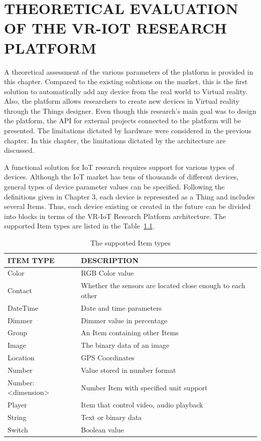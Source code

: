 
\chapter{THEORETICAL EVALUATION OF THE VR-IOT RESEARCH PLATFORM}

A theoretical assessment of the various parameters of the platform is provided in this chapter. Compared to the existing solutions on the market, this is the first solution to automatically add any device from the real world to Virtual reality. Also, the platform allows researchers to create new devices in Virtual reality through the Things designer. Even though this research's main goal was to design the platform, the API for external projects connected to the platform will be presented. The limitations dictated by hardware were considered in the previous chapter. In this chapter, the limitations dictated by the architecture are discussed.

A functional solution for IoT research requires support for various types of devices. Although the IoT market has tens of thousands of different devices, general types of device parameter values ​​can be specified. Following the definitions given in Chapter 3, each device is represented as a Thing and includes several Items. Thus, each device existing or created in the future can be divided into blocks in terms of the VR-IoT Research Platform architecture. The supported Item types are listed in the Table~\ref{tab:items-table}.

\begin{table}
  \centering
  \begin{threeparttable}[c]
    \caption{The supported Item types}
    \label{tab:items-table}
    \begin{tabular}{ll}
      \toprule
      ITEM TYPE    &         DESCRIPTION                 \\
      \midrule
      Color &	RGB Color value \\
      Contact & Whether the sensors are located close enough to each other \\
      DateTime & Date and time parameters \\
      Dimmer &	Dimmer value in percentage \\
      Group &	An Item containing other Items \\
      Image &	The binary data of an image \\
      Location & GPS Coordinates \\
      Number & Value stored in number format \\
      Number:<dimension> & Number Item with specified unit support \\
      Player & Item that control video, audio playback \\
      String &	Text or binary data \\
      Switch & Boolean value \\
      \bottomrule
    \end{tabular}
  \end{threeparttable}
\end{table}

